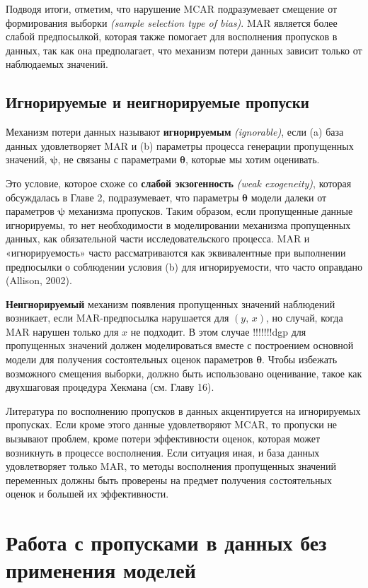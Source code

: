 Подводя итоги, отметим, что нарушение MCAR подразумевает смещение от формирования выборки \emph{(sample selection type of bias)}. MAR является более слабой предпосылкой, которая также помогает для восполнения пропусков в данных, так как она предполагает, что механизм потери данных зависит только от наблюдаемых значений.

\subsection{Игнорируемые и неигнорируемые пропуски} 

Механизм потери данных называют {\bf игнорируемым} \emph{(ignorable)}, если (a) база данных удовлетворяет MAR и (b) параметры процесса генерации пропущенных значений, $\mathbf{\psi}$, не связаны с параметрами $\mathbf{\theta}$, которые мы хотим оценивать.

Это условие, которое схоже со {\bf слабой экзогенность} \emph{(weak exogeneity)}, которая обсуждалась в Главе 2, подразумевает, что параметры $\mathbf{\theta}$ модели далеки от параметров $\mathbf{\psi}$ механизма пропусков. Таким образом, если пропущенные данные игнорируемы, то нет необходимости в моделировании механизма пропущенных данных, как обязательной части исследовательского процесса. MAR и «игнорируемость» часто рассматриваются как эквивалентные при выполнении предпосылки о соблюдении условия (b) для игнорируемости, что часто оправдано (Allison, 2002).

{\bf Неигнорируемый} механизм появления пропущенных значений наблюдений возникает, если MAR-предпосылка нарушается для $(y, \, x)$, но случай, когда MAR нарушен только для $x$ не подходит. В этом случае !!!!!!!dgp для пропущенных значений должен моделироваться вместе с построением основной модели для получения состоятельных оценок параметров $\mathbf{\theta}$. Чтобы избежать возможного смещения выборки, должно быть использовано оценивание, такое как двухшаговая процедура Хекмана (см. Главу 16).

Литература по восполнению пропусков в данных акцентируется на игнорируемых пропусках. Если кроме этого данные удовлетворяют MCAR, то пропуски не вызывают проблем, кроме потери эффективности оценок, которая может возникнуть в процессе восполнения. Если ситуация иная, и база данных удовлетворяет только MAR, то методы восполнения пропущенных значений переменных должны быть проверены на предмет получения состоятельных оценок и большей их эффективности.

\section{Работа с пропусками в данных без применения моделей} 

